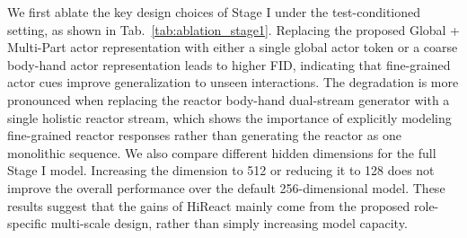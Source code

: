 \documentclass{article}
\begin{document}
We first ablate the key design choices of Stage I under the test-conditioned setting, as shown in Tab.~\ref{tab:ablation_stage1}. Replacing the proposed Global + Multi-Part actor representation with either a single global actor token or a coarse body-hand actor representation leads to higher FID, indicating that fine-grained actor cues improve generalization to unseen interactions. The degradation is more pronounced when replacing the reactor body-hand dual-stream generator with a single holistic reactor stream, which shows the importance of explicitly modeling fine-grained reactor responses rather than generating the reactor as one monolithic sequence. We also compare different hidden dimensions for the full Stage I model. Increasing the dimension to 512 or reducing it to 128 does not improve the overall performance over the default 256-dimensional model. These results suggest that the gains of HiReact mainly come from the proposed role-specific multi-scale design, rather than simply increasing model capacity.


\begin{table}[t]
\centering
\caption{
Ablation study of Stage I modeling choices and model scale on the Inter-X test-conditioned setting.
$\downarrow$ indicates lower is better, $\uparrow$ indicates higher is better, and $\rightarrow$ indicates closer to real motion is better.
Full Stage I corresponds to HiReact* before Stage II refinement.
}
\label{tab:ablation_stage1}
\end{table}
\end{document}
